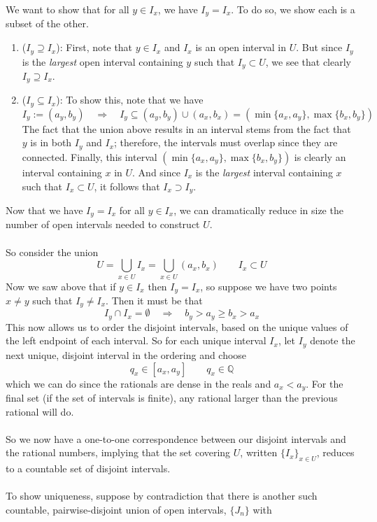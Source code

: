 \documentclass[12pt]{article}
\theoremstyle{plain}
\theoremstyle{definition}
\theoremstyle{remark}
\begin{document}
\begin{enumerate}
We want to show that for all $y\in I_x$, we have $I_y = I_x$. To do so, we show each is a subset of the other.
\begin{enumerate}
    \item ($I_y\supseteq I_x$): First, note that $y\in I_x$ and $I_x$ is an open interval in $U$. But since $I_y$ is the \emph{largest} open interval containing $y$ such that $I_y\subset U$, we see that clearly $I_y\supseteq I_x$. 
    \item ($I_y\subseteq I_x$): To show this, note that we have
\[
    I_y := (a_y, b_y) \quad \Rightarrow \quad
    I_y\subseteq (a_y, b_y) \cup (a_x, b_x) 
    = (\min\{a_x,a_y\}, \max\{b_x, b_y\})
\]
The fact that the union above results in an interval stems from the fact that $y$ is in both $I_y$ and $I_x$; therefore, the intervals must overlap since they are connected. Finally, this interval $(\min\{a_x,a_y\}, \max\{b_x, b_y\})$ is clearly an interval containing $x$ in $U$. And since $I_x$ is the \emph{largest} interval containing $x$ such that $I_x\subset U$, it follows that $I_x\supset I_y$.
\end{enumerate}
Now that we have $I_y = I_x$ for all $y\in I_x$, we can dramatically reduce in size the number of open intervals needed to construct $U$. 
\\
\\
So consider the union
\[
    U = \bigcup_{x\in U} I_x 
    =\bigcup_{x\in U} (a_x, b_x) \qquad I_x \subset U
\]
Now we saw above that if $y\in I_x$ then $I_y = I_x$, so suppose we have two points $x\neq y$ such that $I_y\neq I_x$. Then it must be that
\[
    I_y \cap I_x = \emptyset \quad \Rightarrow
    \quad b_y > a_y \geq b_x > a_x
\]
This now allows us to order the disjoint intervals, based on the unique values of the left endpoint of each interval. So for each unique interval $I_x$, let $I_y$ denote the next unique, disjoint interval in the ordering and choose
\[
    q_x \in [a_x, a_y] \qquad q_x \in \mathbb{Q}
\]
which we can do since the rationals are dense in the reals and $a_x < a_y$. For the final set (if the set of intervals is finite), any rational larger than the previous rational will do.
\\
\\
So we now have a one-to-one correspondence between our disjoint intervals and the rational numbers, implying that the set covering $U$, written $\{I_x\}_{x\in U}$, reduces to a countable set of disjoint intervals. 
\\
\\
To show uniqueness, suppose by contradiction that there is another such countable, pairwise-disjoint union of open intervals, $\{J_n\}$ with

\end{enumerate}
\end{document}

